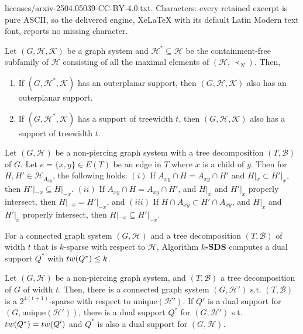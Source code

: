\documentclass[10pt,a4paper]{amsart}
\newcommand{\tw}{\textsc{tw}}
\newcommand{\unique}{\textrm{unique}}
\begin{document}
licenses/arxiv-2504.05039-CC-BY-4.0.txt. Characters: every retained excerpt is pure ASCII, so the delivered engine, XeLaTeX with its default Latin Modern text font, reports no missing character.
\begin{lemma}
\label{lem:contfree}
Let $(G,\mathcal{H,K})$ be a graph system and  $\mathcal{H}^*\subseteq\mathcal{H}$ be the containment-free
subfamily of $\mathcal{H}$ consisting of all the maximal elements of $(\mathcal{H},\prec_N)$.
Then,
\begin{enumerate}
    \item If $(G,\mathcal{H^*,K})$ has an outerplanar support, then $(G,\mathcal{H,K})$ also has an outerplanar support.
    \item If $(G,\mathcal{H^*,K})$ has a support of treewidth $t$, then $(G,\mathcal{H,K})$ also has a support of treewidth $t$.
\end{enumerate}

\end{lemma}

\begin{lemma}
\label{lem:npsep}
Let $(G,\mathcal{H})$ be a non-piercing graph system with
a tree decomposition $(T,\mathcal{B})$ of $G$.
Let $e=\{x,y\}\in E(T)$ be an edge in $T$ where $x$ is a child of $y$.
Then for $H, H'\in\mathcal{H}_{A_{xy}}$, the following holds:
$(i)$ If $A_{xy}\cap H=A_{xy}\cap H'$ and $H|_x\subset H'|_x$, then
$H'|_{-x}\subseteq H|_{-x}$. $(ii)$ If $A_{xy}\cap H=A_{xy}\cap H'$, 
and $H|_x$ and $H'|_x$ properly intersect,
then $H|_{-x}=H'|_{-x}$, and $(iii)$ If $H\cap A_{xy}\subset H'\cap A_{xy}$, and $H|_x$ and $H'|_x$ properly intersect, then $H|_{-x}\subseteq H'|_{-x}$.
\end{lemma}

\begin{lemma}
\label{lem:easydual}
For a connected graph system $(G,\mathcal{H})$ and a tree decomposition
$(T,\mathcal{B})$ of width $t$ that is $k$-sparse with respect to $\mathcal{H}$,
Algorithm {\bf $k$-SDS} computes a dual support
$Q^*$ with $\tw(Q^*)\le k$.
\end{lemma}

\begin{lemma}
\label{lem:mvi}
Let $(G,\mathcal{H})$ be a non-piercing graph system, 
and $(T,\mathcal{B})$ a tree decomposition of $G$ of width $t$.
Then, there is a connected graph system $(G,\mathcal{H}')$ s.t.
$(T,\mathcal{B})$ is a $2^{4(t+1)}$-sparse with respect to $\unique(\mathcal{H}')$. If
$Q'$ is a dual support for $(G,\unique(\mathcal{H}'))$, there
is a dual support $Q^*$ for $(G,\mathcal{H}')$ s.t. $\tw(Q^*)=\tw(Q')$
and $Q^*$ is also a dual support for $(G,\mathcal{H})$.
\end{lemma}
\end{document}
